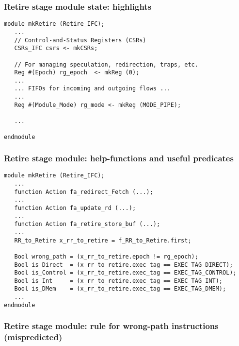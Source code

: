 \begin{frame}[fragile]
\frametitle{Retire stage module state: highlights}

\footnotesize

\begin{minipage}{0.725\textwidth}
\begin{Verbatim}[frame=single, label=From Code/src\_Fife/S5\_Retire.bsv]
module mkRetire (Retire_IFC);
   ...
   // Control-and-Status Registers (CSRs)
   CSRs_IFC csrs <- mkCSRs;

   // For managing speculation, redirection, traps, etc.
   Reg #(Epoch) rg_epoch  <- mkReg (0);
   ...
   ... FIFOs for incoming and outgoing flows ...
   ...
   Reg #(Module_Mode) rg_mode <- mkReg (MODE_PIPE);

   ...

endmodule
\end{Verbatim}
\end{minipage}

\end{frame}


\begin{frame}[fragile]
\frametitle{Retire stage module: help-functions and useful predicates}

\footnotesize

\begin{minipage}{0.725\textwidth}
\begin{Verbatim}[frame=single, label=From Code/src\_Fife/S5\_Retire.bsv]
module mkRetire (Retire_IFC);
   ...
   function Action fa_redirect_Fetch (...);
   ...
   function Action fa_update_rd (...);
   ...
   function Action fa_retire_store_buf (...);
   ...
   RR_to_Retire x_rr_to_retire = f_RR_to_Retire.first;

   Bool wrong_path = (x_rr_to_retire.epoch != rg_epoch);
   Bool is_Direct  = (x_rr_to_retire.exec_tag == EXEC_TAG_DIRECT);
   Bool is_Control = (x_rr_to_retire.exec_tag == EXEC_TAG_CONTROL);
   Bool is_Int     = (x_rr_to_retire.exec_tag == EXEC_TAG_INT);
   Bool is_DMem    = (x_rr_to_retire.exec_tag == EXEC_TAG_DMEM);
   ...
endmodule
\end{Verbatim}
\end{minipage}

\end{frame}


\begin{frame}[fragile]
\frametitle{Retire stage module: rule for wrong-path instructions (mispredicted)}

\footnotesize

\begin{minipage}{0.725\textwidth}
\end{minipage}

\end{frame}

